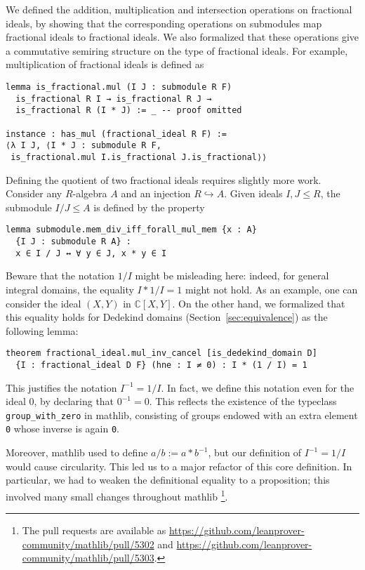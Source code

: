 \documentclass[sn-mathphys]{sn-jnl}%
\renewcommand{\C}{\mathbb{C}}
\newcommand{\lean}[1]{\texttt{#1}\xspace}
\newcommand{\mathlib}{\textsf{mathlib}\xspace}
\begin{document}
We defined the addition, multiplication and intersection operations on fractional ideals,
by showing that the corresponding operations on submodules map fractional ideals to fractional ideals.
We also formalized that these operations give a commutative semiring structure on the type of fractional ideals.
For example, multiplication of fractional ideals is defined as
\begin{lstlisting}
lemma is_fractional.mul (I J : submodule R F)
  is_fractional R I → is_fractional R J →
  is_fractional R (I * J) := _ -- proof omitted

instance : has_mul (fractional_ideal R F) :=
⟨λ I J, ⟨I * J : submodule R F,
 is_fractional.mul I.is_fractional J.is_fractional⟩⟩
\end{lstlisting}

Defining the quotient of two fractional ideals requires slightly more work. Consider any $R$-algebra $A$ and an injection $R\hookrightarrow A$. Given ideals $I,J\le R$, the submodule $I / J\le A$
is defined by the property
\pagebreak[3] %
\begin{lstlisting}
lemma submodule.mem_div_iff_forall_mul_mem {x : A}
  {I J : submodule R A} :
  x ∈ I / J ↔ ∀ y ∈ J, x * y ∈ I
\end{lstlisting}
Beware that the notation $1/I$ might be misleading here: indeed, for general integral domains, the equality $I\ast 1/I=1$ might not hold. As an example, one can consider the ideal $(X,Y)$ in $\C[X,Y]$.
On the other hand, we formalized that this equality holds for Dedekind domains (Section~\ref{sec:equivalence}) as the following lemma:
\begin{lstlisting}
theorem fractional_ideal.mul_inv_cancel [is_dedekind_domain D]
  {I : fractional_ideal D F} (hne : I ≠ 0) : I * (1 / I) = 1
\end{lstlisting}
This justifies the notation $I^{-1}=1/I$. In fact, we define this notation even for the ideal $0$, by declaring that $0^{-1}=0$. This reflects the existence of the typeclass \lean{group\_with\_zero} in \mathlib, consisting of groups endowed with an extra element \lean{0} whose inverse is again \lean{0}.

Moreover, \mathlib used to define \lean{$a / b := a * b^{-1}$}, but our definition of $I^{-1} = 1 / I$ would cause circularity. This led us to a major refactor of this core definition. In particular, we had to weaken the definitional equality to a proposition; this involved many small changes throughout \mathlib
\footnote{The pull requests are available as \url{https://github.com/leanprover-community/mathlib/pull/5302} and \url{https://github.com/leanprover-community/mathlib/pull/5303}.}.
\end{document}
